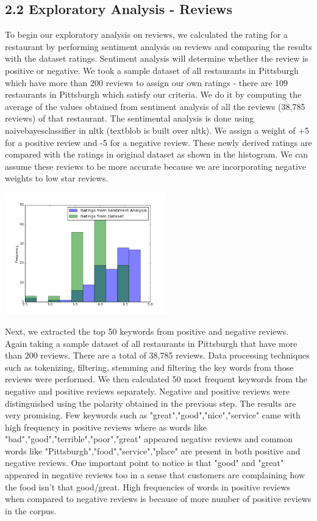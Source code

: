 \documentclass{neu_handout}
\begin{document}
\subsection*{2.2 Exploratory Analysis - Reviews}

To begin our exploratory analysis on reviews, we calculated the rating for a restaurant by performing sentiment analysis on reviews and comparing the results with the dataset ratings. Sentiment analysis will determine whether the review is positive or negative. We took a sample dataset of all restaurants in Pittsburgh which have more than 200 reviews to assign our own ratings - there are 109 restaurants in Pittsburgh which satisfy our criteria. We do it by computing the average of the values obtained from sentiment analysis of all the reviews (38,785 reviews) of that restaurant. The sentimental analysis is done using naivebayesclassifier in nltk (textblob is built over nltk). We assign a weight of +5 for a positive review and -5 for a negative review. These newly derived ratings are compared with the ratings in original dataset as shown in the histogram. We can assume these reviews to be more accurate because we are incorporating negative weights to low star reviews.

\begin{center}
\includegraphics[width=70mm,scale=0.5]{sentimentanalysis}
\end{center}

Next, we extracted the top 50 keywords from positive and negative reviews. Again taking a sample dataset of all restaurants in Pittsburgh that have more than 200 reviews. There are a total of 38,785 reviews. Data processing techniques such as tokenizing, filtering, stemming and filtering the key words from those reviews were performed. We then calculated 50 most frequent keywords from the negative and positive reviews separately. Negative and positive reviews were distinguished using the polarity obtained in the previous step.
The results are very promising. Few keywords such as "great","good","nice","service" came with high frequency in positive reviews where as words like "bad","good","terrible","poor","great" appeared negative reviews and common words like "Pittsburgh","food","service","place" are present in both positive and negative reviews. One important point to notice is that "good" and "great" appeared in negative reviews too in a sense that customers are complaining how the food isn't that good/great. High frequencies of words in positive reviews when compared to negative reviews is because of more number of positive reviews in the corpus.
\end{document}
